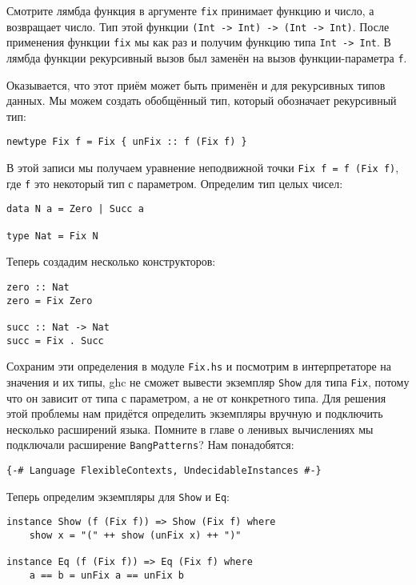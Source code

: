 Смотрите лямбда функция в аргументе \texttt{fix} принимает функцию и
число, а возвращает число. Тип этой функции
\texttt{(Int -\textgreater{} Int) -\textgreater{} (Int -\textgreater{} Int)}.
После применения функции \texttt{fix} мы как раз и получим функцию типа
\texttt{Int -\textgreater{} Int}. В лямбда функции рекурсивный вызов был
заменён на вызов функции-параметра \texttt{f}.

Оказывается, что этот приём может быть применён и для рекурсивных типов
данных. Мы можем создать обобщённый тип, который обозначает рекурсивный
тип:

\begin{verbatim}
newtype Fix f = Fix { unFix :: f (Fix f) }
\end{verbatim}

В этой записи мы получаем уравнение неподвижной точки
\texttt{Fix f = f (Fix f)}, где \texttt{f} это некоторый тип с
параметром. Определим тип целых чисел:

\begin{verbatim}
data N a = Zero | Succ a

type Nat = Fix N
\end{verbatim}

Теперь создадим несколько конструкторов:

\begin{verbatim}
zero :: Nat
zero = Fix Zero

succ :: Nat -> Nat
succ = Fix . Succ
\end{verbatim}

Сохраним эти определения в модуле \texttt{Fix.hs} и посмотрим в
интерпретаторе на значения и их типы, ghc не сможет вывести экземпляр
\texttt{Show} для типа \texttt{Fix}, потому что он зависит от типа с
параметром, а не от конкретного типа. Для решения этой проблемы нам
придётся определить экземпляры вручную и подключить несколько расширений
языка. Помните в главе о ленивых вычислениях мы подключали расширение
\texttt{BangPatterns}? Нам понадобятся:

\begin{verbatim}
{-# Language FlexibleContexts, UndecidableInstances #-}
\end{verbatim}

Теперь определим экземпляры для \texttt{Show} и \texttt{Eq}:

\begin{verbatim}
instance Show (f (Fix f)) => Show (Fix f) where
    show x = "(" ++ show (unFix x) ++ ")"

instance Eq (f (Fix f)) => Eq (Fix f) where
    a == b = unFix a == unFix b
\end{verbatim}

